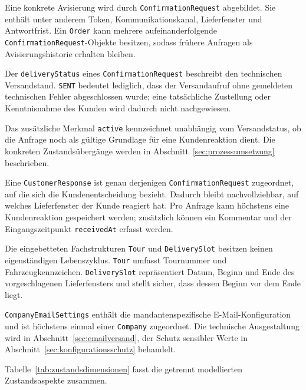 Eine konkrete Avisierung wird durch \texttt{ConfirmationRequest} abgebildet.
Sie enthält unter anderem Token, Kommunikationskanal, Lieferfenster und
Antwortfrist. Ein \texttt{Order} kann mehrere aufeinanderfolgende
\texttt{ConfirmationRequest}-Objekte besitzen, sodass frühere Anfragen als
Avisierungshistorie erhalten bleiben.

Der \texttt{deliveryStatus} eines \texttt{ConfirmationRequest} beschreibt den
technischen Versandstand. \texttt{SENT} bedeutet lediglich, dass der
Versandaufruf ohne gemeldeten technischen Fehler abgeschlossen wurde; eine
tatsächliche Zustellung oder Kenntnisnahme des Kunden wird dadurch nicht
nachgewiesen.

Das zusätzliche Merkmal \texttt{active} kennzeichnet unabhängig vom
Versandstatus, ob die Anfrage noch als gültige Grundlage für eine
Kundenreaktion dient. Die konkreten Zustandsübergänge werden in
Abschnitt~\ref{sec:prozessumsetzung} beschrieben.

Eine \texttt{CustomerResponse} ist genau derjenigen
\texttt{ConfirmationRequest} zugeordnet, auf die sich die Kundenentscheidung
bezieht. Dadurch bleibt nachvollziehbar, auf welches Lieferfenster der Kunde
reagiert hat. Pro Anfrage kann höchstens eine Kundenreaktion gespeichert
werden; zusätzlich können ein Kommentar und der Eingangszeitpunkt
\texttt{receivedAt} erfasst werden.

Die eingebetteten Fachstrukturen \texttt{Tour} und \texttt{DeliverySlot}
besitzen keinen eigenständigen Lebenszyklus. \texttt{Tour} umfasst Tournummer
und Fahrzeugkennzeichen. \texttt{DeliverySlot} repräsentiert Datum, Beginn und
Ende des vorgeschlagenen Lieferfensters und stellt sicher, dass dessen Beginn
vor dem Ende liegt.

\texttt{CompanyEmailSettings} enthält die mandantenspezifische
E-Mail-Konfiguration und ist höchstens einmal einer \texttt{Company}
zugeordnet. Die technische Ausgestaltung wird in
Abschnitt~\ref{sec:emailversand}, der Schutz sensibler Werte in
Abschnitt~\ref{sec:konfigurationsschutz} behandelt.

Tabelle~\ref{tab:zustandsdimensionen} fasst die getrennt modellierten
Zustandsaspekte zusammen.

